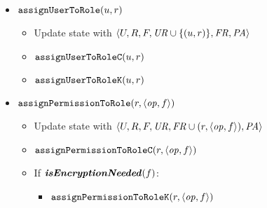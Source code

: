 {\begin{itemize}
        \item \( \mathtt{assignUserToRole}(u, r) \)
        \begin{itemize}
            \item Update state with \( \langle U, \allowbreak R, \allowbreak F, \allowbreak \mathit{UR} \cup \lbrace (u, r) \rbrace, \allowbreak \mathit{FR}, \allowbreak \mathit{PA} \rangle \)
            \item \( \mathtt{assignUserToRole}\mathtt{C}(u, r) \)
            \item \( \mathtt{assignUserToRole}\mathtt{K}(u, r) \)
        \end{itemize}

        \item \( \mathtt{assignPermissionToRole}(r, \langle \mathit{op}, f \rangle) \)
        \begin{itemize}
            \item Update state with \( \langle U, \allowbreak R, \allowbreak F, \allowbreak \mathit{UR}, \allowbreak \mathit{FR} \cup (r, \langle \mathit{op}, \allowbreak f \rangle), \allowbreak \mathit{PA} \rangle \)
            \item \( \mathtt{assignPermissionToRole}\mathtt{C}(r, \langle \mathit{op}, f \rangle) \)
            \item If \( \textbf{\textit{isEncryptionNeeded}}(f) \):
            \begin{itemize}
                \item \( \mathtt{assignPermissionToRole}\mathtt{K}(r, \langle \mathit{op}, f \rangle) \)
            \end{itemize}
        \end{itemize}

    \end{itemize}
}{
    \begin{itemize}


\end{itemize}}
